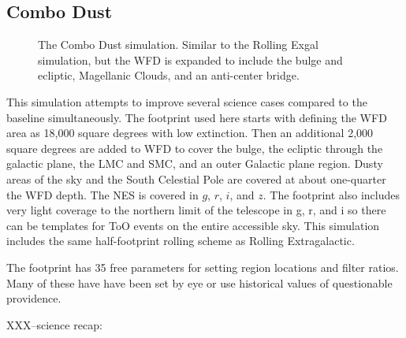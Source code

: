 \subsection{Combo Dust}

\begin{figure}
\caption{The Combo Dust simulation. Similar to the Rolling Exgal simulation, but the WFD is expanded to include the bulge and ecliptic, Magellanic Clouds, and an anti-center bridge.  }\label{fig:combodust}
\end{figure}


This simulation attempts to improve several science cases compared to the baseline simultaneously. The footprint used here starts with defining the WFD area as 18,000 square degrees with low extinction. Then an additional 2,000 square degrees are added to WFD to cover the bulge, the ecliptic through the galactic plane, the LMC and SMC, and an outer Galactic plane region. Dusty areas of the sky and the South Celestial Pole are covered at about one-quarter the WFD depth. The NES is covered in $g$, $r$, $i$, and $z$. The footprint also includes very light coverage to the northern limit of the telescope in g, r, and i so there can be templates for ToO events on the entire accessible sky. This simulation includes the same half-footprint rolling scheme as Rolling Extragalactic.

The footprint has 35 free parameters for setting region locations and filter ratios. Many of these have have been set by eye or use historical values of questionable providence. 

XXX--science recap:  


